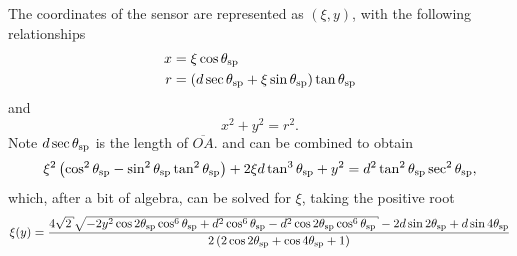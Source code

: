 The coordinates of the sensor are represented as $(\xi,y)$, with the
following relationships
\begin{align}
  x & = \xi \cos \theta_\mathrm{sp} \label{eqn:conic01a}                                             \\
  r & = \left(d \sec \theta_\mathrm{sp} + \xi \sin \theta_\mathrm{sp}\right) \tan\theta_\mathrm{sp} \label{eqn:conic01b}
\end{align}
and
\begin{equation}
  x^2+y^2=r^2.
  \label{eqn:conic01c}
\end{equation}
Note $d \sec\theta_\mathrm{sp}$ is the length of $\overline{OA}$.
 and  can be combined to obtain
\begin{equation}
  \xi^2 \left(\cos ^2\theta_\mathrm{sp}-\sin ^2\theta_\mathrm{sp} \tan
  ^2\theta_\mathrm{sp}\right)+2 \xi d \tan ^3\theta_\mathrm{sp}+y^2=d^2 \tan
  ^2\theta_\mathrm{sp} \sec ^2\theta_\mathrm{sp},
\end{equation}
which, after a bit of algebra, can be solved for $\xi$, taking
the positive root
\begin{equation}
  \xi(y) = \frac{4 \sqrt{2} \sqrt{-2 y^2 \cos 2 \thetasp  \cos ^6\thetasp +d^2
      \cos ^6\thetasp -d^2 \cos 2 \thetasp  \cos^6\thetasp}-2 d \sin 2 \thetasp
    +d \sin 4 \thetasp }{2 \left(2 \cos 2 \thetasp +\cos 4 \thetasp +1\right)}
  \label{eqn:conic02}
\end{equation}


